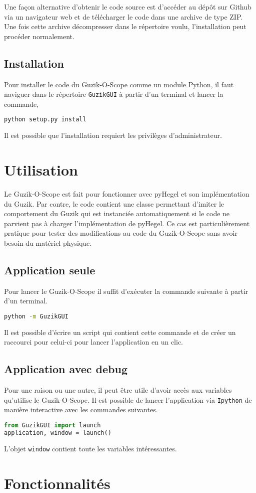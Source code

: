 \documentclass[openright,letterpaper,12pt]{book}
\begin{document}
Une façon alternative d'obtenir le code source est d'accéder au dépôt sur 
Github via un navigateur web et de télécharger le code dans une archive de 
type ZIP. 
Une fois cette archive décompresser dans le répertoire voulu, l'installation 
peut procéder normalement.

\section*{Installation}
Pour installer le code du Guzik-O-Scope comme un module Python, il faut 
naviguer dans le répertoire \verb+GuzikGUI+ à partir d'un terminal et lancer 
la commande,
\begin{lstlisting}[language=Bash]
python setup.py install
\end{lstlisting}
Il est possible que l'installation requiert les privilèges d'administrateur. 

\chapter*{Utilisation}
Le Guzik-O-Scope est fait pour fonctionner avec pyHegel et son implémentation 
du Guzik. 
Par contre, le code contient une classe permettant d'imiter le comportement du 
Guzik qui est instanciée automatiquement si le code ne parvient pas à 
charger l'implémentation de pyHegel. 
Ce cas est particulièrement pratique pour tester des modifications au code du 
Guzik-O-Scope sans avoir besoin du matériel physique.
\section*{Application seule}
Pour lancer le Guzik-O-Scope il suffit d'exécuter la commande suivante à partir 
d'un terminal.
\begin{lstlisting}[language=Bash]
python -m GuzikGUI
\end{lstlisting}
Il est possible d'écrire un script qui contient cette commande et de créer un 
raccourci pour celui-ci pour lancer l'application en un clic.

\section*{Application avec debug}
Pour une raison ou une autre, il peut être utile d'avoir accès aux variables 
qu'utilise le Guzik-O-Scope. 
Il est possible de lancer l'application via \verb+Ipython+ de manière 
interactive avec les commandes suivantes.
\begin{lstlisting}[language=Python]
from GuzikGUI import launch
application, window = launch()
\end{lstlisting}
L'objet \verb+window+ contient toute les variables intéressantes.
\clearpage\null\thispagestyle{empty}

\chapter*{Fonctionnalités}
\end{document}
